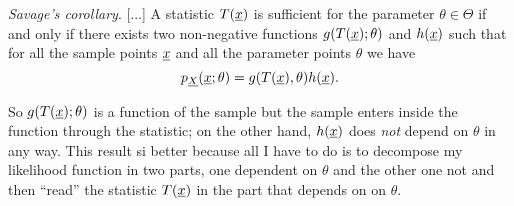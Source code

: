 \documentclass[12pt]{report}
\begin{document}
\begin{corollary}
	\emph{Savage's corollary}. [...] A statistic $T(\underline{x})$ is sufficient for the parameter $\theta\in\Theta$ if and only if there exists two non-negative functions $g(T(\underline{x});\theta)$ and $h(\underline{x})$ such that for all the sample points $\underline{x}$ and all the parameter points $\theta$ we have
	\begin{equation*}
		p_{\underline{X}}(\underline{x};\theta)=g(T(\underline{x}),\theta)h(\underline{x}).
	\end{equation*}
\end{corollary}
So $g(T(\underline{x});\theta)$ is a function of the sample but the sample enters inside the function through the statistic; on the other hand, $h(\underline{x})$ does \textit{not} depend on $\theta$ in any way. This result si better because all I have to do is to decompose my likelihood function in two parts, one dependent on $\theta$ and the other one not and then ``read'' the statistic $T(\underline{x})$ in the part that depends on on $\theta$.
\end{document}
